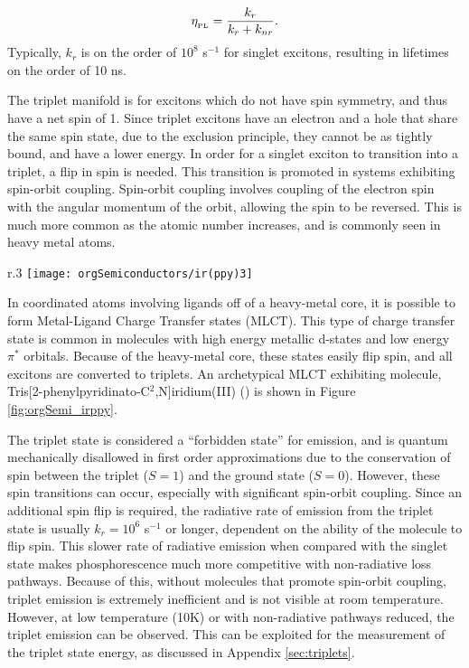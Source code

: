 \documentclass[../thesis.tex]{subfiles}
\begin{document}
\begin{equation}
\eta_{_\text{\tiny PL}}=\frac{k_r}{k_r+k_{nr}}.
\label{orgSemi_pl_efficiency}
\end{equation}
Typically, $k_r$ is on the order of $10^8$ s$^{-1}$ for singlet excitons, resulting in lifetimes on the order of 10 ns.

The triplet manifold is for excitons which do not have spin symmetry, and thus have a net spin of 1.
Since triplet excitons have an electron and a hole that share the same spin state, due to the exclusion principle, they cannot be as tightly bound, and have a lower energy.
In order for a singlet exciton to transition into a triplet, a flip in spin is needed.  
This transition is promoted in systems exhibiting spin-orbit coupling.
Spin-orbit coupling involves coupling of the electron spin with the angular momentum of the orbit, allowing the spin to be reversed.
This is much more common as the atomic number increases, and is commonly seen in heavy metal atoms.

\begin{wrapfigure}{r}{.3\textwidth}
\centering
\texttt{[image: orgSemiconductors/ir(ppy)3]}
\caption{A MLCT molecule, \irppy.}
\label{fig:orgSemi_irppy}
\end{wrapfigure}

In coordinated atoms involving ligands off of a heavy-metal core, it is possible to form Metal-Ligand Charge Transfer states (MLCT).
This type of charge transfer state is common in molecules  with high energy metallic d-states and low energy $\pi^*$ orbitals.
Because of the heavy-metal core, these states easily flip spin, and all excitons are converted to triplets.
An archetypical MLCT exhibiting molecule, Tris[2-phenylpyridinato-C$^2$,N]iridium(III) (\irppy) is shown in Figure \ref{fig:orgSemi_irppy}.

The triplet state is considered a ``forbidden state'' for emission, and is quantum mechanically disallowed in first order approximations due to the conservation of spin between the triplet ($S=1$) and the ground state ($S=0$).
However, these spin transitions can occur, especially with significant spin-orbit coupling.
Since an additional spin flip is required, the radiative rate of emission from the triplet state is usually $k_r=10^6$ s$^{-1}$ or longer, dependent on the ability of the molecule to flip spin.
This slower rate of radiative emission when compared with the singlet state makes phosphorescence much more competitive with non-radiative loss pathways.
Because of this, without molecules that promote spin-orbit coupling, triplet emission is extremely inefficient and is not visible at room temperature.
However, at low temperature (10K)\supercite{Holmes2003,Turro1991a,Goushi2004d,Frankfurt1989,Padhye1956} or with non-radiative pathways reduced,\supercite{Reineke2014} the triplet emission can be observed.
This can be exploited for the measurement of the triplet state energy, as discussed in Appendix \ref{sec:triplets}.
\end{document}
